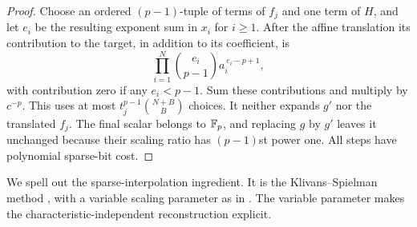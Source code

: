 \begin{proof}
Choose an ordered $(p-1)$-tuple of terms of $f_j$ and one term of
$H$, and let $e_i$ be the resulting exponent sum in $x_i$ for
$i\geq1$. After the affine translation its contribution to the target,
in addition to its coefficient, is
\[
 \prod_{i=1}^N\binom{e_i}{p-1}a_i^{\,e_i-p+1},
\]
with contribution zero if any $e_i<p-1$. Sum these contributions and
multiply by $c^{-p}$. This uses at most
$t_j^{p-1}\binom{N+B}{B}$ choices. It neither expands $g'$ nor the
translated $f_j$. The final scalar belongs to $\mathbb F_p$, and replacing
$g$ by $g'$ leaves it unchanged because their scaling ratio has
$(p-1)$st power one. All steps have polynomial sparse-bit cost.
\end{proof}

We spell out the sparse-interpolation ingredient. It is the
Klivans--Spielman method \citep[Section~6.3, Theorem~11]{sp-ks},
with a variable scaling parameter as in
\citet[Section~3, Theorem~3.2]{sp-cs-sparse}. The variable parameter
makes the characteristic-independent reconstruction explicit.

